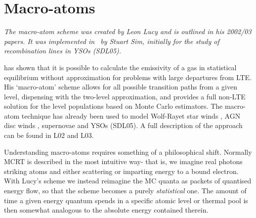 
\section{Macro-atoms}
\label{sec:matoms}
{\sl The macro-atom scheme was created by Leon Lucy and is outlined in 
his 2002/03 papers. It was implemented in \py\ by Stuart Sim, initially
for the study of recombination lines in YSOs (SDL05).
}

\citet[][hereafter L02, L03]{lucy2002, lucy2003}
has shown that it is possible to calculate the emissivity of a gas in
statistical equilibrium without approximation for problems with large departures
from LTE.
His `macro-atom' scheme allows for all possible transition paths from a given level,
dispensing with the two-level approximation, and
provides a full non-LTE solution
for the level populations based on Monte Carlo estimators. The macro-atom
technique has already been used to model Wolf-Rayet star
winds \citep{sim2004}, AGN disc winds \citep{simlong2008, tatum2012},
supernovae \citep{kromersim2009, kerzendorfsim} and YSOs (SDL05). A full 
description of the approach can be found in L02 and L03. 

Understanding macro-atoms requires something of a philosophical shift.
Normally MCRT is described in the most intuitive way- that is, we imagine
real photons striking atoms and either scattering or imparting energy to a 
bound electron. With Lucy's scheme we instead 
reimagine the MC quanta as packets of quantised energy flow, 
so that the scheme becomes a purely
{\em statistical} one. The amount of time a given energy quantum spends in a specific atomic
level or thermal pool is then somewhat analogous to the absolute energy 
contained therein.

